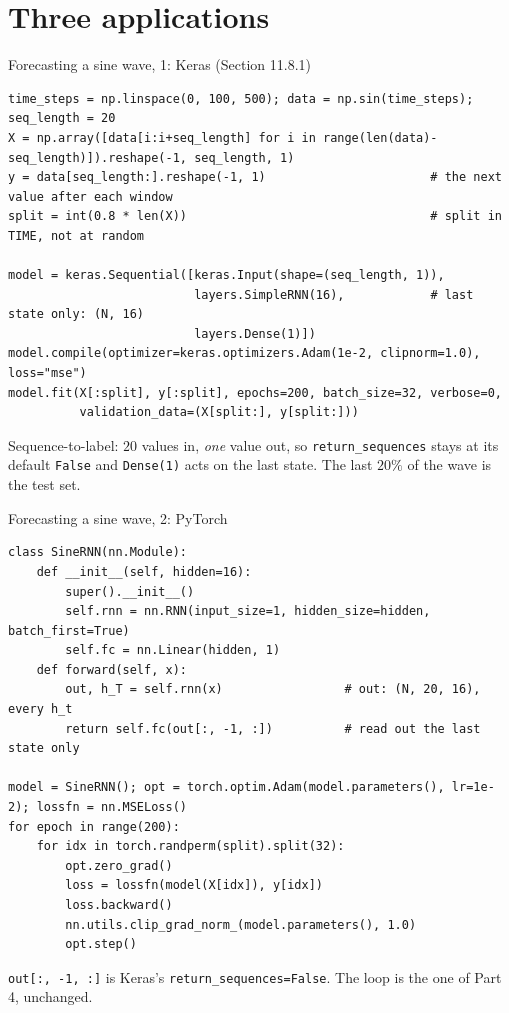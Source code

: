 \documentclass[10pt,aspectratio=169]{beamer}
\begin{document}
\section{Three applications}


\begin{frame}[fragile]{Forecasting a sine wave, 1: Keras (Section 11.8.1)}
\begin{lstlisting}
time_steps = np.linspace(0, 100, 500); data = np.sin(time_steps); seq_length = 20
X = np.array([data[i:i+seq_length] for i in range(len(data)-seq_length)]).reshape(-1, seq_length, 1)
y = data[seq_length:].reshape(-1, 1)                       # the next value after each window
split = int(0.8 * len(X))                                  # split in TIME, not at random

model = keras.Sequential([keras.Input(shape=(seq_length, 1)),
                          layers.SimpleRNN(16),            # last state only: (N, 16)
                          layers.Dense(1)])
model.compile(optimizer=keras.optimizers.Adam(1e-2, clipnorm=1.0), loss="mse")
model.fit(X[:split], y[:split], epochs=200, batch_size=32, verbose=0,
          validation_data=(X[split:], y[split:]))
\end{lstlisting}
\small
Sequence-to-label: $20$ values in, \emph{one} value out, so
\texttt{return\_sequences} stays at its default \texttt{False} and
\texttt{Dense(1)} acts on the last state.  The last $20\%$ of the wave is
the test set.
\end{frame}

\begin{frame}[fragile]{Forecasting a sine wave, 2: PyTorch}
\begin{lstlisting}
class SineRNN(nn.Module):
    def __init__(self, hidden=16):
        super().__init__()
        self.rnn = nn.RNN(input_size=1, hidden_size=hidden, batch_first=True)
        self.fc = nn.Linear(hidden, 1)
    def forward(self, x):
        out, h_T = self.rnn(x)                 # out: (N, 20, 16), every h_t
        return self.fc(out[:, -1, :])          # read out the last state only

model = SineRNN(); opt = torch.optim.Adam(model.parameters(), lr=1e-2); lossfn = nn.MSELoss()
for epoch in range(200):
    for idx in torch.randperm(split).split(32):
        opt.zero_grad()
        loss = lossfn(model(X[idx]), y[idx])
        loss.backward()
        nn.utils.clip_grad_norm_(model.parameters(), 1.0)
        opt.step()
\end{lstlisting}
\small
\texttt{out[:, -1, :]} is Keras's \texttt{return\_sequences=False}.  The
loop is the one of Part 4, unchanged.
\end{frame}
\end{document}
